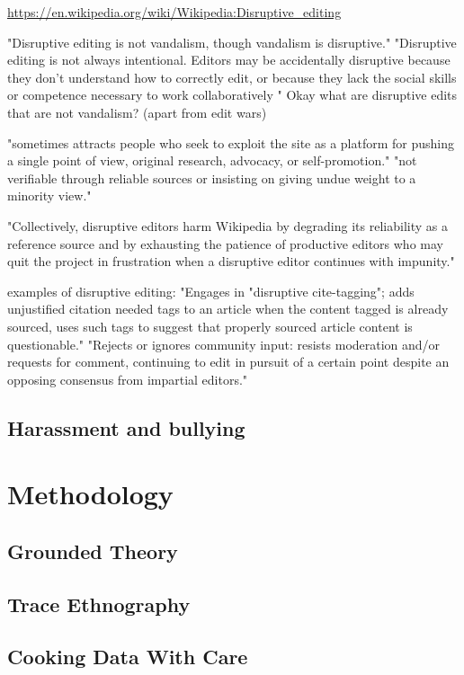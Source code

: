 \documentclass{sigchi}
\begin{document}
\url{https://en.wikipedia.org/wiki/Wikipedia:Disruptive_editing}

"Disruptive editing is not vandalism, though vandalism is disruptive."
"Disruptive editing is not always intentional. Editors may be accidentally disruptive because they don't understand how to correctly edit, or because they lack the social skills or competence necessary to work collaboratively "
Okay what are disruptive edits that are not vandalism? (apart from edit wars)

"sometimes attracts people who seek to exploit the site as a platform for pushing a single point of view, original research, advocacy, or self-promotion."
"not verifiable through reliable sources or insisting on giving undue weight to a minority view."

"Collectively, disruptive editors harm Wikipedia by degrading its reliability as a reference source and by exhausting the patience of productive editors who may quit the project in frustration when a disruptive editor continues with impunity."

examples of disruptive editing:
"Engages in "disruptive cite-tagging"; adds unjustified {{citation needed}} tags to an article when the content tagged is already sourced, uses such tags to suggest that properly sourced article content is questionable."
"Rejects or ignores community input: resists moderation and/or requests for comment, continuing to edit in pursuit of a certain point despite an opposing consensus from impartial editors."

\subsection{Harassment and bullying}


\section{Methodology}

\subsection{Grounded Theory}
\subsection{Trace Ethnography}
\subsection{Cooking Data With Care}
\end{document}
